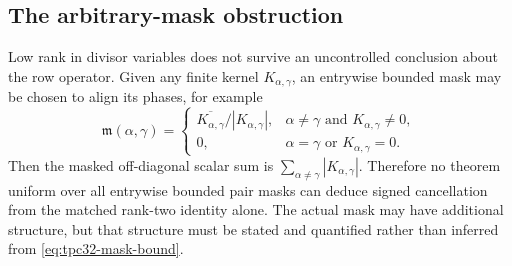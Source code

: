 \subsection{The arbitrary-mask obstruction}

Low rank in divisor variables does not survive an uncontrolled conclusion
about the row operator.  Given any finite kernel $K_{\alpha,\gamma}$, an
entrywise bounded mask may be chosen to align its phases, for example
\begin{equation}
 \mathfrak m(\alpha,\gamma)=
 \begin{cases}
  \overline{K_{\alpha,\gamma}}/|K_{\alpha,\gamma}|,
    &\alpha\ne\gamma\text{ and }K_{\alpha,\gamma}\ne0,\\
  0,&\alpha=\gamma\text{ or }K_{\alpha,\gamma}=0.
 \end{cases}
 \label{eq:tpc32-sign-mask}
\end{equation}
Then the masked off-diagonal scalar sum is
$\sum_{\alpha\ne\gamma}|K_{\alpha,\gamma}|$.  Therefore no
theorem uniform over all entrywise bounded pair masks can deduce signed
cancellation from the matched rank-two identity alone.  The actual mask
may have additional structure, but that structure must be stated and
quantified rather than inferred from \eqref{eq:tpc32-mask-bound}.
